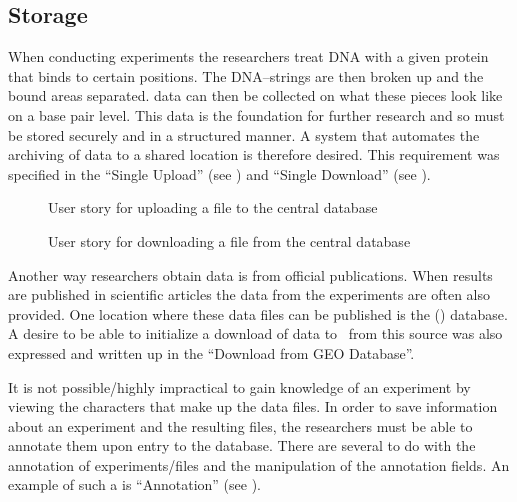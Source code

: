 \subsection{Storage}

When conducting experiments the researchers treat DNA with a given protein that binds to certain positions. The DNA--strings are then broken up and the bound areas separated.  data can then be collected on what these pieces look like on a base pair level. This data is the foundation for further research and so must be stored securely and in a structured manner. A system that automates the archiving of  data to a shared location is therefore desired. This requirement was specified in the  ``Single Upload'' (see ) and ``Single Download'' (see ).

\begin{figure}[h]
\caption{User story for uploading a file to the central database}
\label{fig:target_upload}
\end{figure}

\begin{figure}[h]
\caption{User story for downloading a file from the central database}
\label{fig:target_download}
\end{figure}

Another way researchers obtain  data is from official publications. When results are published in scientific articles the  data from the experiments are often also provided. One location where these  data files can be published is the  () database. A desire to be able to initialize a download of  data to \appName\ from this source was also expressed and written up in the  ``Download from GEO Database''. 

It is not possible/highly impractical to gain knowledge of an experiment by viewing the characters that make up the  data files. In order to save information about an experiment and the resulting files, the researchers must be able to annotate them upon entry to the database. There are several  to do with the annotation of experiments/files and the manipulation of the annotation fields. An example of such a  is ``Annotation'' (see ).

